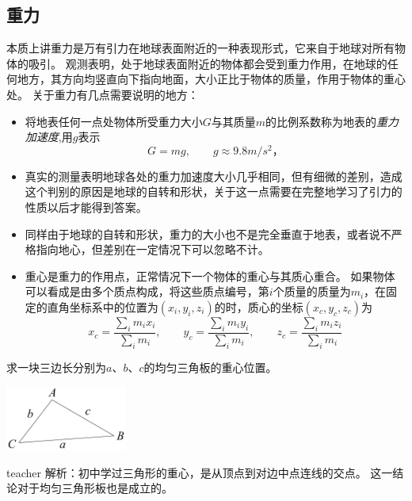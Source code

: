\subsection{重力}
本质上讲重力是万有引力在地球表面附近的一种表现形式，它来自于地球对所有物体的吸引。
观测表明，处于地球表面附近的物体都会受到重力作用，在地球的任何地方，其方向均竖直向下指向地面，大小正比于物体的质量，作用于物体的重心处。
关于重力有几点需要说明的地方：
\begin{itemize}
\item
将地表任何一点处物体所受重力大小$G$与其质量$m$的比例系数称为地表的\emph{重力加速度},用$g$表示
\begin{equation}
G = mg,\qquad g\approx 9.8\unit{m/s^2}，
\end{equation}
\item
真实的测量表明地球各处的重力加速度大小几乎相同，但有细微的差别，造成这个判别的原因是地球的自转和形状，关于这一点需要在完整地学习了引力的性质以后才能得到答案。
\item
同样由于地球的自转和形状，重力的大小也不是完全垂直于地表，或者说不严格指向地心，但差别在一定情况下可以忽略不计。
\item
重心是重力的作用点，正常情况下一个物体的重心与其质心重合。
如果物体可以看成是由多个质点构成，将这些质点编号，第$i$个质量的质量为$m_i$，在固定的直角坐标系中的位置为$(x_i,y_i,z_i)$的时，质心的坐标$(x_c,y_c,z_c)$为
\begin{equation}
x_c=\frac{\sum_i m_ix_i}{\sum_i m_i},\qquad y_c=\frac{\sum_i m_iy_i}{\sum_i m_i},\qquad 
z_c=\frac{\sum_i m_iz_i}{\sum_i m_i}
\end{equation}

\end{itemize}

\begin{example}
求一块三边长分别为$a、b、c$的均匀三角板的重心位置。
\begin{flushright}
\includegraphics[width = 0.3\textwidth]{images/static-force-1.pdf} 
\end{flushright}

\begin{taggedblock}{teacher}
\vspace*{4cm}
\noindent
解析：初中学过三角形的重心，是从顶点到对边中点连线的交点。
这一结论对于均匀三角形板也是成立的。
\end{taggedblock}
\end{example}


